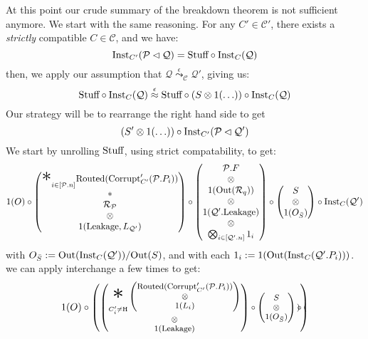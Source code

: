 \begin{theorem}
   At this point our crude summary of the breakdown theorem is not
  sufficient anymore.
  We start with the same reasoning.
  For any $C' \in \mathcal{C}'$, there exists a \emph{strictly}
  compatible $C \in \mathcal{C}$, and we have:
  $$
  \tx{Inst}_{C'}(\mathcal{P} \lhd \mathcal{Q}) = \tx{Stuff} \circ \tx{Inst}_C(\mathcal{Q})
  $$
  then, we apply our assumption that $\mathcal{Q} \overset{\epsilon}{\leadsto}_{\mathcal{C}} \mathcal{Q}'$,
  giving us:
  $$
  \tx{Stuff} \circ \tx{Inst}_C(\mathcal{Q}) \overset{\epsilon}{\approx} \tx{Stuff} \circ (S \otimes 1(\ldots)) \circ \tx{Inst}_C(\mathcal{Q})
  $$
  Our strategy will be to rearrange the right hand side to get
  $$
  {(S' \otimes 1(\ldots)) \circ \tx{Inst}_{C'}(\mathcal{P} \lhd \mathcal{Q}')}
  $$
  We start by unrolling $\tx{Stuff}$, using strict compatability, to get:
  $$
  1(O)\circ
  \begin{pmatrix}
    {\displaystyle \bigast}_{i \in [\mathcal{P}.n]} \tx{Routed}(\tx{Corrupt}'_{C'}(\mathcal{P}.P_i))
    \cr
    *\cr
    \mathcal{R}_{\mathcal{P}}\cr
    \otimes\cr
    1(\tx{Leakage}, L_{\mathcal{Q}'})
  \end{pmatrix}
  \circ
  \begin{pmatrix}
    \mathcal{P}.F\cr
    \otimes\cr
    1(\tx{Out}(\mathcal{R}_q))\cr
    \otimes\cr
    1(\mathcal{Q}'.\tx{Leakage})\cr
    \otimes\cr
    \bigotimes_{i \in [\mathcal{Q}'.n]} 1_i\cr
  \end{pmatrix}
  \circ
  \begin{pmatrix}
    S\cr
    \otimes\cr
    1(O_{\bar{S}})
  \end{pmatrix}
  \circ
  \tx{Inst}_C(\mathcal{Q}')
  $$
  with $O_{\bar{S}} := \tx{Out}(\tx{Inst}_C(\mathcal{Q}')) / \tx{Out}(S)$,
  and with each $1_i := 1(\tx{Out}(\tx{Inst}_C(\mathcal{Q}'.P_i)))$.
  we can apply interchange a few times to get:
  $$
  \footnotesize
  1(O) \circ
  \begin{pmatrix}
    \begin{pmatrix}
    {\displaystyle \bigast_{C'_i \neq \tx{H}}}
    \begin{pmatrix}
      \tx{Routed}(\tx{Corrupt}'_{C'}(\mathcal{P}.P_i))\cr
      \otimes\cr
      1(L_i)
    \end{pmatrix}\cr
    \otimes\cr
    1(\tx{Leakage})
    \end{pmatrix}
    \circ
    \begin{pmatrix}
      S\cr
      \otimes\cr
      1(O_{\bar{S}})
    \end{pmatrix}
    \circ
    \begin{pmatrix}

\end{pmatrix}
\end{pmatrix}$$
\end{theorem}
